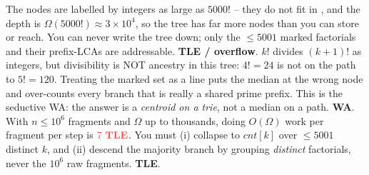 \begin{thinkbox}
{The nodes are labelled by integers as large as \(5000!\) -- they do not fit in ,
and the depth is \(\Omega(5000!)\approx 3\times10^4\), so the tree has far more nodes than you can
store or reach. You can never write the tree down; only the \(\le5001\) marked factorials and
their prefix-LCAs are addressable. \textbf{TLE / overflow}.}
{\(k!\) divides \((k{+}1)!\) as integers, but divisibility is NOT ancestry in this tree: \(4!=24\)
is not on the path to \(5!=120\). Treating the marked set as a line puts the median at the wrong
node and over-counts every branch that is really a shared prime prefix. This is the seductive WA:
the answer is a \emph{centroid on a trie}, not a median on a path. \textbf{WA}.}
{With \(n\le10^6\) fragments and \(\Omega\) up to thousands, doing \(O(\Omega)\) work per fragment
per step is \(\tle\). You must (i) collapse to \(\mathit{cnt}[k]\) over \(\le5001\) distinct
\(k\), and (ii) descend the majority branch by grouping \emph{distinct} factorials, never the
\(10^6\) raw fragments. \textbf{TLE}.}
\end{thinkbox}

